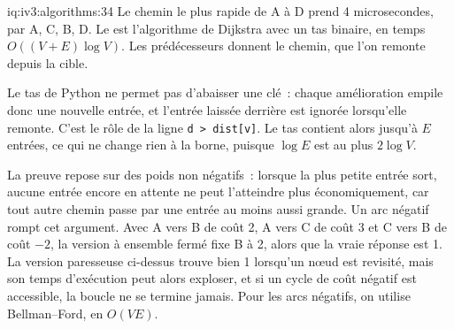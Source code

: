 \begin{solution}{iq:iv3:algorithms:34}
Le chemin le plus rapide de A à D prend 4 microsecondes, par A, C, B, D. Le  est l'algorithme de Dijkstra avec un tas binaire, en temps $O((V + E) \log V)$. Les prédécesseurs donnent le chemin, que l'on remonte depuis la cible.
\label{lst:iv3:al:dijkstra}

Le tas de Python ne permet pas d'abaisser une clé~: chaque amélioration empile donc une nouvelle entrée, et l'entrée laissée derrière est ignorée lorsqu'elle remonte. C'est le rôle de la ligne \texttt{d > dist[v]}. Le tas contient alors jusqu'à $E$ entrées, ce qui ne change rien à la borne, puisque $\log E$ est au plus $2 \log V$.

La preuve repose sur des poids non négatifs~: lorsque la plus petite entrée sort, aucune entrée encore en attente ne peut l'atteindre plus économiquement, car tout autre chemin passe par une entrée au moins aussi grande. Un arc négatif rompt cet argument. Avec A vers B de coût 2, A vers C de coût 3 et C vers B de coût $-2$, la version à ensemble fermé fixe B à 2, alors que la vraie réponse est 1. La version paresseuse ci-dessus trouve bien 1 lorsqu'un nœud est revisité, mais son temps d'exécution peut alors exploser, et si un cycle de coût négatif est accessible, la boucle ne se termine jamais. Pour les arcs négatifs, on utilise Bellman--Ford, en $O(VE)$.

\end{solution}

